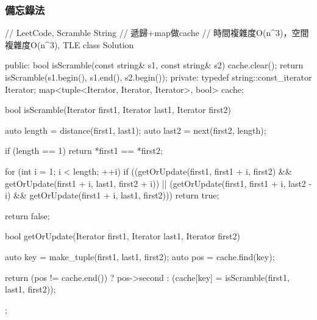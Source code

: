 \subsubsection{備忘錄法}
\begin{Code}
// LeetCode, Scramble String
// 遞歸+map做cache
// 時間複雜度O(n^3)，空間複雜度O(n^3), TLE
class Solution {
public:
    bool isScramble(const string& s1, const string& s2) {
        cache.clear();
        return isScramble(s1.begin(), s1.end(), s2.begin());
    }
private:
    typedef string::const_iterator Iterator;
    map<tuple<Iterator, Iterator, Iterator>, bool> cache;

    bool isScramble(Iterator first1, Iterator last1, Iterator first2) {
        auto length = distance(first1, last1);
        auto last2 = next(first2, length);

        if (length == 1) return *first1 == *first2;

        for (int i = 1; i < length; ++i)
            if ((getOrUpdate(first1, first1 + i, first2)
                    && getOrUpdate(first1 + i, last1, first2 + i))
                    || (getOrUpdate(first1, first1 + i, last2 - i)
                            && getOrUpdate(first1 + i, last1, first2)))
                return true;

        return false;
    }

    bool getOrUpdate(Iterator first1, Iterator last1, Iterator first2) {
        auto key = make_tuple(first1, last1, first2);
        auto pos = cache.find(key);

        return (pos != cache.end()) ?
                pos->second : (cache[key] = isScramble(first1, last1, first2));
    }
};
\end{Code}


